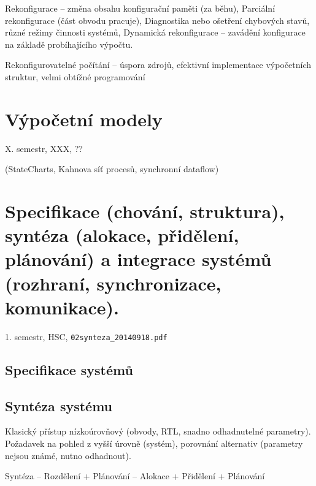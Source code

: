 \documentclass[a4paper, 11pt]{report}
\begin{document}
Rekonfigurace -- změna obsahu konfigurační paměti (za běhu), Parciální rekonfigurace (část obvodu pracuje), Diagnostika nebo ošetření chybových stavů, různé režimy činnosti systémů, Dynamická rekonfigurace -- zavádění konfigurace na základě probíhajícího výpočtu.

Rekonfigurovatelné počítání -- úspora zdrojů, efektivní implementace výpočetních struktur, velmi obtížné programování












\chapter{Výpočetní modely} \label{cha:2}
X. semestr, XXX, ??

(StateCharts, Kahnova síť procesů, synchronní dataflow)

\chapter{Specifikace (chování, struktura), syntéza (alokace, přidělení, plánování) a integrace systémů (rozhraní, synchronizace, komunikace).} \label{cha:3}
1. semestr, HSC, \texttt{02synteza\_20140918.pdf}

\section{Specifikace systémů}

\section{Syntéza systému}
Klasický přístup nízkoúrovňový (obvody, RTL, snadno odhadnutelné parametry). Požadavek na pohled z vyšší úrovně (systém), porovnání alternativ (parametry nejsou známé, nutno odhadnout).

Syntéza -- Rozdělení + Plánování -- Alokace + Přidělení + Plánování
\end{document}
